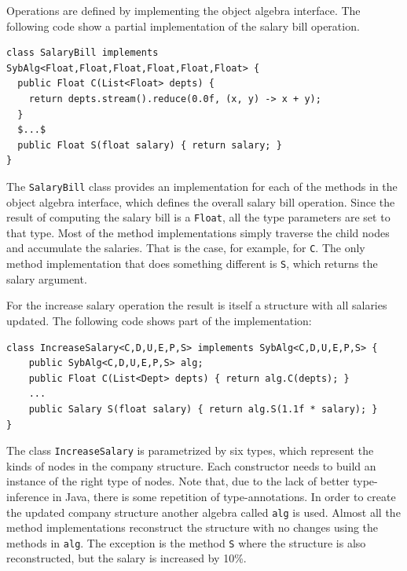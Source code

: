 Operations are defined by implementing the object algebra interface.
The following code show a partial implementation of the salary bill
operation.

\begin{lstlisting}[numbers=none,mathescape=true]
class SalaryBill implements SybAlg<Float,Float,Float,Float,Float,Float> {
  public Float C(List<Float> depts) {
    return depts.stream().reduce(0.0f, (x, y) -> x + y);
  }
  $...$
  public Float S(float salary) { return salary; }
}
\end{lstlisting}

The \lstinline{SalaryBill} class provides an implementation for each
of the methods in the object algebra interface, which defines the
overall salary bill operation. Since the result of computing the
salary bill is a \lstinline{Float}, all the type parameters are set to
that type. Most of the method implementations simply traverse the
child nodes and accumulate the salaries. That is the case, for
example, for \lstinline{C}. The only method implementation that does
something different is \lstinline{S}, which returns the salary
argument.

For the increase salary operation the result is itself a structure
with all salaries updated. The following code shows part of the
implementation:

\begin{lstlisting}[numbers=none]
class IncreaseSalary<C,D,U,E,P,S> implements SybAlg<C,D,U,E,P,S> {
	public SybAlg<C,D,U,E,P,S> alg;
	public Float C(List<Dept> depts) { return alg.C(depts); }
	...
	public Salary S(float salary) { return alg.S(1.1f * salary); }
}
\end{lstlisting}

The class \lstinline{IncreaseSalary} is parametrized by six types,
which represent the kinds of nodes in the company structure. Each
constructor needs to build an instance of the right type of nodes.
Note that, due to the lack of better type-inference in Java, there is
some repetition of type-annotations. In order to create the updated
company structure another algebra called \lstinline{alg} is used.
Almost all the method implementations reconstruct the structure with
no changes using the methods in \lstinline{alg}. The exception is the
method \lstinline{S} where the structure is also reconstructed, but
the salary is increased by 10\%.

